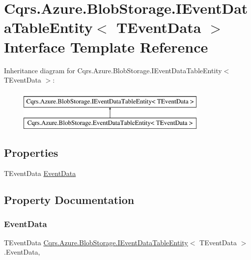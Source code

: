 \hypertarget{interfaceCqrs_1_1Azure_1_1BlobStorage_1_1IEventDataTableEntity}{}\section{Cqrs.\+Azure.\+Blob\+Storage.\+I\+Event\+Data\+Table\+Entity$<$ T\+Event\+Data $>$ Interface Template Reference}
\label{interfaceCqrs_1_1Azure_1_1BlobStorage_1_1IEventDataTableEntity}
Inheritance diagram for Cqrs.\+Azure.\+Blob\+Storage.\+I\+Event\+Data\+Table\+Entity$<$ T\+Event\+Data $>$\+:\begin{figure}[H]
\begin{center}
\leavevmode
\includegraphics[height=2.000000cm]{interfaceCqrs_1_1Azure_1_1BlobStorage_1_1IEventDataTableEntity}
\end{center}
\end{figure}
\subsection*{Properties}
\begin{DoxyCompactItemize}
\item 
T\+Event\+Data \hyperlink{interfaceCqrs_1_1Azure_1_1BlobStorage_1_1IEventDataTableEntity_aa7b1f06172ce68c2cb2248be422edfe5}{Event\+Data}
\end{DoxyCompactItemize}


\subsection{Property Documentation}
\mbox{\label{interfaceCqrs_1_1Azure_1_1BlobStorage_1_1IEventDataTableEntity_aa7b1f06172ce68c2cb2248be422edfe5}} 
\subsubsection{\texorpdfstring{Event\+Data}{EventData}}
{\footnotesize\ttfamily T\+Event\+Data \hyperlink{interfaceCqrs_1_1Azure_1_1BlobStorage_1_1IEventDataTableEntity}{Cqrs.\+Azure.\+Blob\+Storage.\+I\+Event\+Data\+Table\+Entity}$<$ T\+Event\+Data $>$.Event\+Data\hspace{0.3cm}{\ttfamily [get]}, {\ttfamily [set]}}

